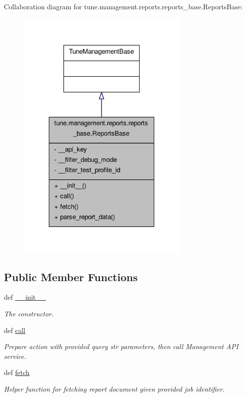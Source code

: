 Collaboration diagram for tune.\-management.\-reports.\-reports\-\_\-base.\-Reports\-Base\-:
\nopagebreak
\begin{figure}[H]
\begin{center}
\leavevmode
\includegraphics[width=240pt]{classtune_1_1management_1_1reports_1_1reports__base_1_1ReportsBase__coll__graph}
\end{center}
\end{figure}
\subsection*{Public Member Functions}
\begin{DoxyCompactItemize}
\item 
def \hyperlink{classtune_1_1management_1_1reports_1_1reports__base_1_1ReportsBase_a7c3d8bf4c6e2bbb094de29da317c370e}{\-\_\-\-\_\-init\-\_\-\-\_\-}
\begin{DoxyCompactList}\small\item\em The constructor. \end{DoxyCompactList}\item 
def \hyperlink{classtune_1_1management_1_1reports_1_1reports__base_1_1ReportsBase_a1fb536c3921bc036376ad46ba5415b77}{call}
\begin{DoxyCompactList}\small\item\em Prepare action with provided query str parameters, then call Management A\-P\-I service. \end{DoxyCompactList}\item 
def \hyperlink{classtune_1_1management_1_1reports_1_1reports__base_1_1ReportsBase_acc99351961b5f4bc700bf28cff0d1de2}{fetch}
\begin{DoxyCompactList}\small\item\em Helper function for fetching report document given provided job identifier. \end{DoxyCompactList}\end{DoxyCompactItemize}
